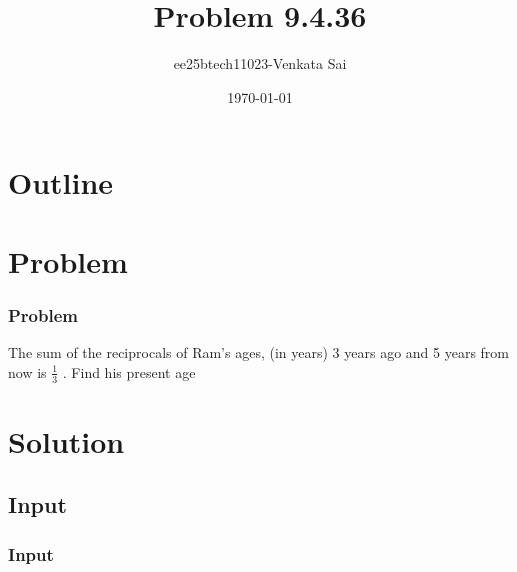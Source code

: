 \documentclass{beamer}
\title{Problem 9.4.36}
\author{ee25btech11023-Venkata Sai}
\date{\today}
\theoremstyle{remark}
\numberwithin{equation}{section}
\begin{document}
\begin{frame}
\titlepage
\end{frame}

\section*{Outline}
\begin{frame}
\tableofcontents
\end{frame}

\section{Problem}

\begin{frame}
\frametitle{Problem}
The sum of the reciprocals of Ram's ages, (in years) 3 years ago and 5 years from
now is $\frac{1}{3}$ . Find his present age
\end{frame}
\section{Solution}

\subsection{Input}
\setcounter{section}{1}
\begin{frame}
\frametitle{Input}
 
\end{frame}
\end{document}
